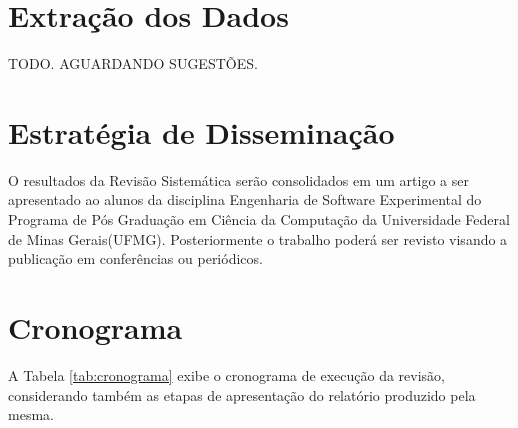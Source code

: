 \documentclass{article}
\begin{document}
\section{Extração dos Dados}
\label{sec:extracao_dados}


TODO. AGUARDANDO SUGESTÕES.


\section{Estratégia de Disseminação}
\label{sec:dissiminacao}
O resultados da Revisão Sistemática serão consolidados em um artigo a ser
apresentado ao alunos da disciplina Engenharia de Software Experimental do
Programa de Pós Graduação em Ciência da Computação da Universidade Federal de
Minas Gerais(UFMG). Posteriormente o trabalho poderá ser revisto visando a
publicação em conferências ou periódicos.
\section{Cronograma}
\label{sec:cronograma}


A Tabela \ref{tab:cronograma} exibe o cronograma de execução da revisão, considerando
também as etapas de apresentação do relatório produzido pela mesma.
\end{document}
